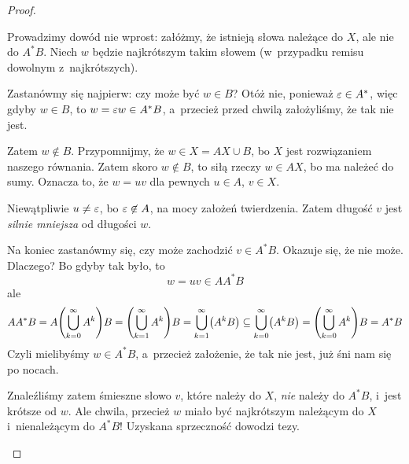 \begin{proof}
\begin{enumerate}[label={(\roman*)}]
		      Prowadzimy dowód nie wprost: załóżmy, że istnieją słowa należące do \(X\), ale nie do \(A^*B\). Niech \(w\) będzie najkrótszym takim słowem (w~przypadku remisu dowolnym z~najkrótszych).

		      Zastanówmy się najpierw: czy może być \(w \in B\)? Otóż nie, ponieważ \(\varepsilon \in A^*\), więc gdyby \(w \in B\), to \(w = \varepsilon w \in A^*B\), a~przecież przed chwilą założyliśmy, że tak nie jest.

		      Zatem \(w \not\in B\). Przypomnijmy, że \(w \in X = AX \cup B\), bo \(X\) jest rozwiązaniem naszego równania. Zatem skoro \(w \not\in B\), to siłą rzeczy \(w \in AX\), bo ma należeć do sumy. Oznacza to, że \(w = uv\) dla pewnych \(u \in A\), \(v \in X\).

		      Niewątpliwie \(u \neq \varepsilon\), bo \(\varepsilon \not\in A\), na mocy założeń twierdzenia. Zatem długość \(v\) jest \emph{silnie mniejsza} od długości \(w\).

		      Na koniec zastanówmy się, czy może zachodzić \(v \in A^*B\). Okazuje się, że nie może. Dlaczego? Bo gdyby tak było, to
		      \begin{equation*}
			      w = uv \in AA^*B
		      \end{equation*}
		      ale
		      \begin{equation*}
			      AA^*B
			      = A\pars{\bigcup_{k = 0}^{\infty}A^k}B
			      = \pars{\bigcup_{k = 1}^{\infty}A^k}B
			      = \bigcup_{k = 1}^{\infty}\pars{A^kB}
			      \subseteq \bigcup_{k = 0}^{\infty}\pars{A^kB}
			      = \pars{\bigcup_{k = 0}^{\infty}A^k}B
			      = A^*B
		      \end{equation*}
		      Czyli mielibyśmy \(w \in A^*B\), a~przecież założenie, że tak nie jest, już śni nam się po nocach.

		      Znaleźliśmy zatem śmieszne słowo \(v\), które należy do \(X\), \emph{nie} należy do \(A^*B\), i~jest krótsze od \(w\). Ale chwila, przecież \(w\) miało być najkrótszym należącym do \(X\) i~nienależącym do \(A^*B\)! Uzyskana sprzeczność dowodzi tezy.
	\end{enumerate}
\end{proof}

